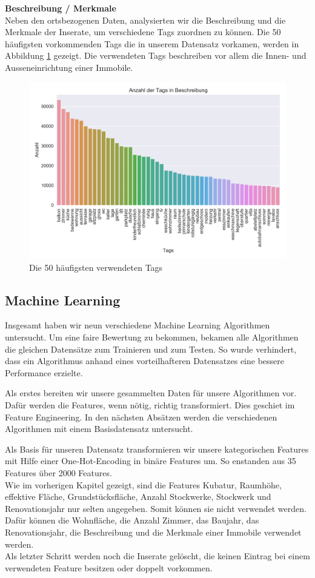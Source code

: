 \textbf{Beschreibung / Merkmale}\\
Neben den ortsbezogenen Daten, analysierten wir die Beschreibung und die Merkmale der Inserate, um verschiedene Tags zuordnen zu können. Die 50 häufigsten vorkommenden Tags die in unserem Datensatz vorkamen, werden in Abbildung \ref{fig:tags} gezeigt. Die verwendeten Tags beschreiben vor allem die Innen- und Ausseneinrichtung einer Immobile.
%
\begin{figure}[ht]
\centering
\includegraphics[width=\textwidth]{images/tags.png}
\caption[Die 50 häufigsten verwendeten Tags]{Die 50 häufigsten verwendeten Tags}%
\label{fig:tags}
\end{figure}

\subsection{Machine Learning}
Insgesamt haben wir neun verschiedene Machine Learning Algorithmen untersucht. Um eine faire Bewertung zu bekommen, bekamen alle Algorithmen die gleichen Datensätze zum Trainieren und zum Testen. So wurde verhindert, dass ein Algorithmus anhand eines vorteilhafteren Datensatzes eine bessere Performance erzielte. 

Als erstes bereiten wir unsere gesammelten Daten für unsere Algorithmen vor. Dafür werden die Features, wenn nötig, richtig transformiert. Dies geschiet im Feature Engineering. In den nächsten Absätzen werden die verschiedenen Algorithmen mit einem Basisdatensatz untersucht.

Als Basis für unseren Datensatz transformieren wir unsere kategorischen Features mit Hilfe einer One-Hot-Encoding in binäre Features um. So enstanden aus 35 Features über 2000 Features.\\
Wie im vorherigen Kapitel gezeigt, sind die Features Kubatur, Raumhöhe, effektive Fläche, Grundstücksfläche, Anzahl Stockwerke, Stockwerk und Renovationsjahr nur selten angegeben. Somit können sie nicht verwendet werden. Dafür können die Wohnfläche, die Anzahl Zimmer, das Baujahr, das Renovationsjahr, die Beschreibung und die Merkmale einer Immobile verwendet werden.\\
Als letzter Schritt werden noch die Inserate gelöscht, die keinen Eintrag bei einem verwendeten Feature besitzen oder doppelt vorkommen.

